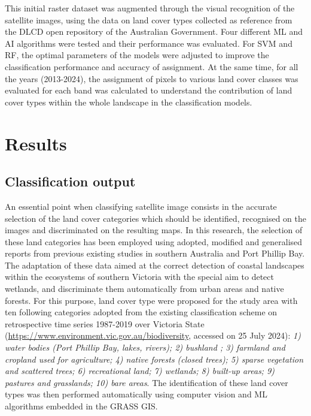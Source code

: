 \documentclass[jmse,article,submit,pdftex,moreauthors]{Definitions/mdpi}
\begin{document}
This initial raster dataset was augmented through the visual recognition of the satellite images, using the data on land cover types collected as reference from the DLCD open repository of the Australian Government. Four different ML and AI algorithms were tested and their performance was evaluated. For SVM and RF, the optimal parameters of the models were adjusted to improve the classification performance and accuracy of assignment. At the same time, for all the years (2013-2024), the assignment of pixels to various land cover classes was evaluated for each band was calculated to understand the contribution of land cover types within the whole landscape in the classification models.  

\section{Results}

\subsection{Classification output}

An essential point when classifying satellite image consists in the accurate selection of the land cover categories which should be identified, recognised on the images and discriminated on the resulting maps. In this research, the selection of these land categories has been employed using adopted, modified and generalised reports from previous existing studies in southern Australia and Port Phillip Bay. The adaptation of these data  aimed at the correct detection of coastal landscapes within the ecosystems of southern Victoria with the special aim to detect wetlands, and discriminate them automatically from urban areas and native forests. For this purpose, land cover type were proposed for the study area with ten following categories adopted from the existing classification scheme on retrospective time series 1987-2019 over Victoria State (\href{https://www.environment.vic.gov.au/biodiversity/Victorias-Land-Cover-Time-Series}{https://www.environment.vic.gov.au/biodiversity}, accessed on 25 July 2024): \emph{1) water bodies (Port Phillip Bay, lakes, rivers); 2) bushland ; 3) farmland and cropland used for agriculture; 4) native forests (closed trees); 5) sparse vegetation and scattered trees; 6) recreational land; 7) wetlands; 8) built-up areas; 9) pastures and grasslands; 10) bare areas}. The identification of these land cover types was then performed automatically using computer vision and ML algorithms embedded in the GRASS GIS.
\end{document}

